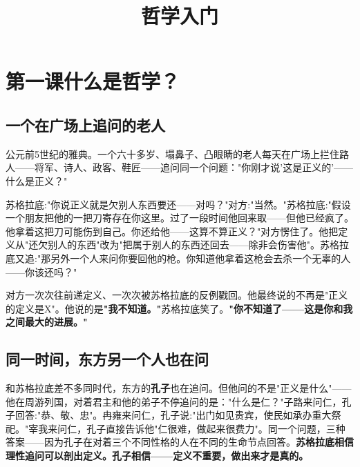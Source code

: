 \documentclass[a4paper,12pt]{ctexart}
\title{\textcolor{blue!70!black}{\Huge\textbf{哲学入门}}}
\author{}
\date{}
\begin{document}
\maketitle
\thispagestyle{empty}

\tableofcontents
\newpage

\section{\textcolor{orange!80!black}{第一课\quad 什么是哲学？}}

\subsection*{一个在广场上追问的老人}

公元前5世纪的雅典。一个六十多岁、塌鼻子、凸眼睛的老人每天在广场上拦住路人——将军、诗人、政客、鞋匠——追问同一个问题："你刚才说'这是正义的'——什么是正义？"

苏格拉底:"你说正义就是欠别人东西要还——对吗？"对方:"当然。"苏格拉底:"假设一个朋友把他的一把刀寄存在你这里。过了一段时间他回来取——但他已经疯了。他拿着这把刀可能伤到自己。你还给他——这算不算正义？"对方愣住了。他把定义从"还欠别人的东西"改为"把属于别人的东西还回去——除非会伤害他"。苏格拉底又追:"那另外一个人来问你要回他的枪。你知道他拿着这枪会去杀一个无辜的人——你该还吗？"

对方一次次往前递定义、一次次被苏格拉底的反例戳回。他最终说的不再是"正义的定义是X"。他说的是\:\textbf{"我不知道。"}\:苏格拉底笑了。\textbf{"你不知道了——这是你和我之间最大的进展。"}

\subsection*{同一时间，东方另一个人也在问}

和苏格拉底差不多同时代，东方的\textbf{孔子}也在追问。但他问的不是"正义是什么"——他在周游列国，对着君主和他的弟子不停追问的是："什么是仁？"子路来问仁，孔子回答:"恭、敬、忠"。冉雍来问仁，孔子说:"出门如见贵宾，使民如承办重大祭祀。"宰我来问仁，孔子直接告诉他"仁很难，做起来很费力"。同一个问题，三种答案——因为孔子在对着三个不同性格的人在不同的生命节点回答。\textbf{苏格拉底相信理性追问可以剖出定义。孔子相信——定义不重要，做出来才是真的。}

\end{document}

